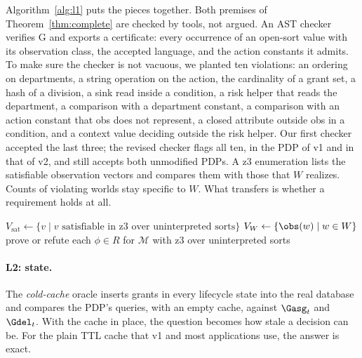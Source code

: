 Algorithm~\ref{alg:l1} puts the pieces together. Both premises of Theorem~\ref{thm:complete} are checked by
tools, not argued. An AST checker verifies G and exports a certificate: every occurrence of an open-sort value
with its observation class, the accepted language, and the action constants it admits. To make sure the checker
is not vacuous, we planted ten violations: an ordering on departments, a string operation on the action, the
cardinality of a grant set, a hash of a division, a sink read inside a condition, a risk helper that reads the
department, a comparison with a department constant, a comparison with an action constant that obs does not
represent, a closed attribute outside obs in a condition, and a context value deciding outside the risk helper.
Our first checker accepted the last three; the
revised checker flags all ten, in the PDP of v1 and in that of v2, and still accepts both unmodified PDPs. A z3 enumeration lists the satisfiable observation vectors and compares them with those that
$W$ realizes. Counts of violating worlds stay specific to $W$. What transfers is whether a requirement holds at
all.

\begin{algorithm}[t]
\caption{Complete bounded L1 check}
\label{alg:l1}
$V_{\mathrm{sat}}\gets\{v\mid v \text{ satisfiable in z3 over uninterpreted sorts}\}$\;
$V_W\gets\{\obs(w)\mid w\in W\}$\;
prove or refute each $\phi\in R$ for $\mathcal{M}$ with z3 over uninterpreted sorts\;
\end{algorithm}

\paragraph{L2: state.} The \emph{cold-cache} oracle inserts grants in every lifecycle state into the real
database and compares the PDP's queries, with an empty cache, against $\Gasg_t$ and $\Gdel_t$. With the cache
in place, the question becomes how stale a decision can be. For the plain TTL cache that \sysname v1 and most
applications use, the answer is exact.

